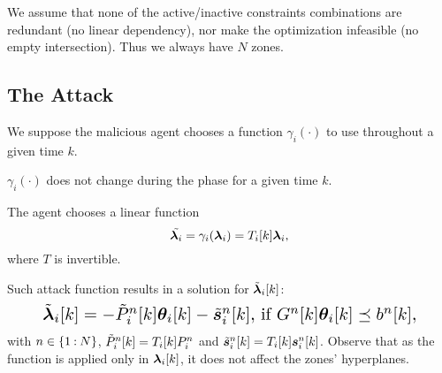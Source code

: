 \documentclass{ifacconf}  %
\begin{document}
 \begin{assumption}
   We assume that none of the active/inactive constraints combinations are redundant (no linear dependency), nor make the optimization infeasible (no empty intersection).
   Thus we always have $N$ zones.
 \end{assumption}



\subsection{The Attack}\label{ssec:attack}
We suppose the malicious agent chooses a function $\gamma_{i}(\cdot)$ to use throughout a given time $k$.
\begin{assumption}
  $\gamma_{i}(\cdot)$ does not change during the \negotiation{} phase for a given time $k$.
\end{assumption}

\begin{assumption}
  The agent chooses a linear function
  \begin{equation}
\tilde{\lambdai}=\gamma_{i}(\vec{\lambda}_{i})=\Tik\vec{\lambda}_{i},
\end{equation}
  where $T$ is invertible.
\end{assumption}

Such attack function results in a \pwa{} solution for $\tilde{\boldsymbol{\lambda}}_i[k]$:
\begin{equation}
  \resizebox{.88\columnwidth}{!}{$
    \label{eq:linear_cheating}
    \lambdaicheat[k]=
      -\tilde{P}_{i}^{n}[k]\thetaik-\tilde{\vec{s}}_{i}^{n}[k]\text{, if}\ G^{n}[k]\thetaik \preceq b^{n}[k],
    $}
\end{equation}
with $n\in\{1\mathbin{:} N\}$, $\tilde{P}_{i}^{n}[k]=\Tik P_{i}^{n}$ and $\tilde{\vec{s}}_{i}^{n}[k]=\Tik\vec{s}_{i}^{n}[k]$.
Observe that as the function is applied only in $\lambdaik$, it does not affect the zones' hyperplanes.
\end{document}
